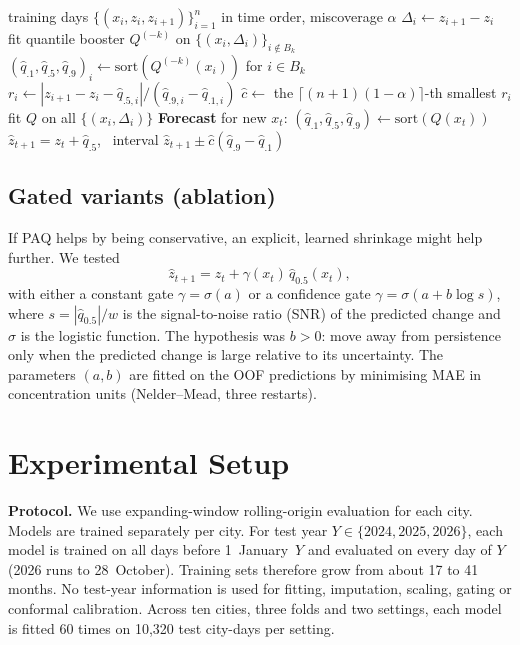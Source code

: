 \documentclass[conference]{IEEEtran}
\begin{document}
\begin{algorithm}[t]
\caption{PAQ training and forecasting}\label{alg:paq}
\begin{algorithmic}[1]
\Require training days $\{(x_i,z_i,z_{i+1})\}_{i=1}^n$ in time order, miscoverage $\alpha$
\State $\Delta_i\gets z_{i+1}-z_i$
 
  \State fit quantile booster $Q^{(-k)}$ on $\{(x_i,\Delta_i)\}_{i\notin B_k}$
  \State $(\hat q_{.1},\hat q_{.5},\hat q_{.9})_i\gets\mathrm{sort}(Q^{(-k)}(x_i))$ for $i\in B_k$
\EndFor
\State $r_i\gets|z_{i+1}-z_i-\hat q_{.5,i}|/(\hat q_{.9,i}-\hat q_{.1,i})$
\State $\hat c\gets$ the $\lceil(n+1)(1-\alpha)\rceil$-th smallest $r_i$
\State fit $Q$ on all $\{(x_i,\Delta_i)\}$
\State \textbf{Forecast} for new $x_t$: $(\hat q_{.1},\hat q_{.5},\hat q_{.9})\gets\mathrm{sort}(Q(x_t))$
\State \Return $\hat z_{t+1}=z_t+\hat q_{.5}$, \ interval $\hat z_{t+1}\pm\hat c(\hat q_{.9}-\hat q_{.1})$
\end{algorithmic}
\end{algorithm}

\subsection{Gated variants (ablation)}
If PAQ helps by being conservative, an explicit, learned shrinkage might help further.
We tested
\begin{equation}
\hat z_{t+1}=z_t+\gamma(x_t)\,\hat q_{0.5}(x_t),
\end{equation}
with either a constant gate $\gamma=\sigma(a)$ or a confidence gate
$\gamma=\sigma(a+b\log s)$, where $s=|\hat q_{0.5}|/w$ is the signal-to-noise ratio
(SNR) of the predicted change and $\sigma$ is the logistic function. The hypothesis was
$b>0$: move away from persistence only when the predicted change is large relative to
its uncertainty. The parameters $(a,b)$ are fitted on the OOF predictions by minimising MAE in
concentration units (Nelder--Mead, three restarts).

\section{Experimental Setup}\label{sec:setup}
\textbf{Protocol.} We use expanding-window rolling-origin evaluation for each city.
Models are trained separately per city. For test year $Y\in\{2024,2025,2026\}$, each model is
trained on all days before 1~January~$Y$ and evaluated on every day of $Y$ (2026 runs to
28~October). Training sets therefore grow from about 17 to 41 months. No test-year
information is used for fitting, imputation, scaling, gating or conformal calibration.
Across ten cities, three folds and two settings, each model is fitted 60 times on
10{,}320 test city-days per setting.
\end{document}
